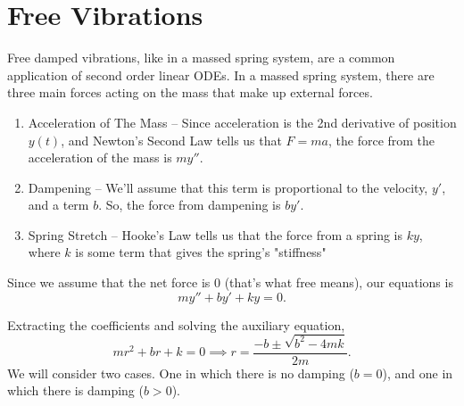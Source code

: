 \section{Free Vibrations}
\noindent
Free damped vibrations, like in a massed spring system, are a common application of second order linear ODEs.
In a massed spring system, there are three main forces acting on the mass that make up external forces.
\begin{enumerate}[label=\arabic*)]
	\item Acceleration of The Mass -- Since acceleration is the 2nd derivative of position $y(t)$, and Newton's Second Law tells us that $F = ma$, the force from the acceleration of the mass is $my''$.
	\item Dampening -- We'll assume that this term is proportional to the velocity, $y'$, and a term $b$. So, the force from dampening is $by'$.
	\item Spring Stretch -- Hooke's Law tells us that the force from a spring is $ky$, where $k$ is some term that gives the spring's "stiffness"
\end{enumerate}
Since we assume that the net force is 0 (that's what free means), our equations is
\begin{equation*}
	my'' + by' + ky = 0.
\end{equation*}

\noindent
Extracting the coefficients and solving the auxiliary equation,
\begin{equation*}
	mr^2 + br + k = 0 \implies r = \frac{-b \pm \sqrt{b^2 - 4mk}}{2m}.
\end{equation*}
We will consider two cases.
One in which there is no damping ($b = 0$), and one in which there is damping ($b > 0$).


